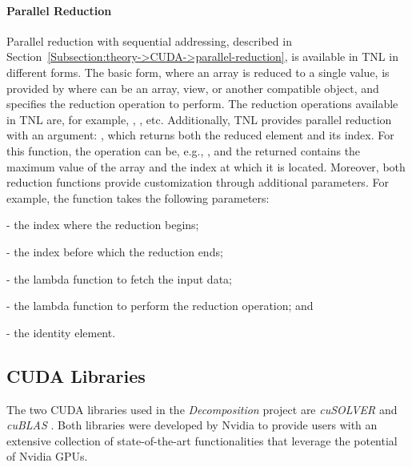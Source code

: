 \paragraph{Parallel Reduction} Parallel reduction with sequential addressing, described in Section~\ref{Subsection:theory->CUDA->parallel-reduction}, is available in TNL in different forms.
The basic form, where an array is reduced to a single value, is provided by  where  can be an array, view, or another compatible object, and  specifies the reduction operation to perform.
The reduction operations available in TNL are, for example, , , etc.
Additionally, TNL provides parallel reduction with an argument: , which returns both the reduced element and its index.
For this function, the  operation can be, e.g., , and the returned  contains the maximum value of the array and the index at which it is located.
Moreover, both reduction functions provide customization through additional parameters.
For example, the  function takes the following parameters:

\begin{tight_itemize}
	\item {} - the index where the reduction begins;
	\item {} - the index before which the reduction ends;
	\item {} - the lambda function to fetch the input data;
	\item {} - the lambda function to perform the reduction operation; and
	\item {} - the identity element.
\end{tight_itemize}



\subsection{CUDA Libraries}
The two CUDA libraries used in the \textit{Decomposition} project are \textit{cuSOLVER} \cite{5D33zKi5iStCty0r} and \textit{cuBLAS} \cite{h9oJtLLHaTFaL3ME}.
Both libraries were developed by Nvidia to provide users with an extensive collection of state-of-the-art functionalities that leverage the potential of Nvidia GPUs.

